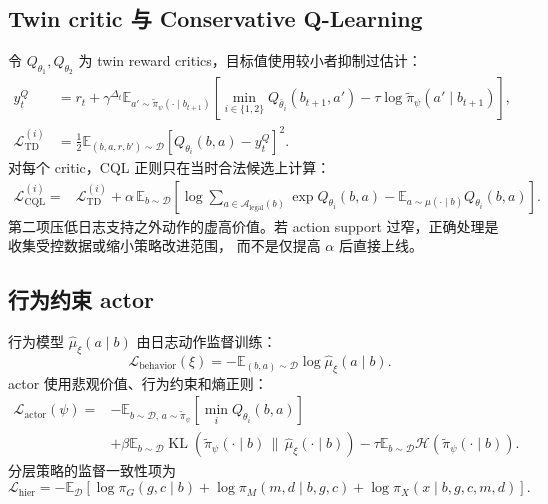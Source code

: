 \documentclass[11pt,a4paper,fontset=none]{ctexart}
\DeclareMathOperator{\KL}{KL}
\newcommand{\E}{\mathbb{E}}
\newcommand{\1}{\mathbb{I}}
\newcommand{\D}{\mathcal{D}}
\newcommand{\Alegal}{\mathcal{A}_{\mathrm{legal}}}
\begin{document}
\subsection{Twin critic 与 Conservative Q-Learning}

令 $Q_{\theta_1},Q_{\theta_2}$ 为 twin reward critics，目标值使用较小者抑制过估计：
\begin{align}
  y_t^Q&=r_t+\gamma^{\Delta_t}
  \E_{a'\sim\widetilde\pi_\psi(\cdot\mid b_{t+1})}
  \left[\min_{i\in\{1,2\}}Q_{\bar\theta_i}(b_{t+1},a')
        -\tau\log\widetilde\pi_\psi(a'\mid b_{t+1})\right],\\
  \mathcal{L}_{\mathrm{TD}}^{(i)}
  &=\frac12\E_{(b,a,r,b')\sim\D}
  \left[Q_{\theta_i}(b,a)-y_t^Q\right]^2.
  \label{eq:td-loss}
\end{align}
对每个 critic，CQL 正则只在当时合法候选上计算：
\begin{align}
  \mathcal{L}_{\mathrm{CQL}}^{(i)}={}&
  \mathcal{L}_{\mathrm{TD}}^{(i)}
  +\alpha\,\E_{b\sim\D}\left[
    \log\sum_{a\in\Alegal(b)}\exp Q_{\theta_i}(b,a)
    -\E_{a\sim\mu(\cdot\mid b)}Q_{\theta_i}(b,a)
  \right].
  \label{eq:cql-loss}
\end{align}
第二项压低日志支持之外动作的虚高价值。若 action support 过窄，正确处理是收集受控数据或缩小策略改进范围，
而不是仅提高 $\alpha$ 后直接上线。

\subsection{行为约束 actor}

行为模型 $\widehat\mu_\xi(a\mid b)$ 由日志动作监督训练：
\begin{equation}
  \mathcal{L}_{\mathrm{behavior}}(\xi)=
  -\E_{(b,a)\sim\D}\log\widehat\mu_\xi(a\mid b).
\end{equation}
actor 使用悲观价值、行为约束和熵正则：
\begin{align}
  \mathcal{L}_{\mathrm{actor}}(\psi)={}&
  -\E_{b\sim\D,\,a\sim\widetilde\pi_\psi}
    \left[\min_i Q_{\theta_i}(b,a)\right]\nonumber\\
  &+\beta\E_{b\sim\D}\KL\!\left(
    \widetilde\pi_\psi(\cdot\mid b)\,\|\,
    \widehat\mu_\xi(\cdot\mid b)\right)
  -\tau\E_{b\sim\D}\mathcal{H}(\widetilde\pi_\psi(\cdot\mid b)).
  \label{eq:actor-loss}
\end{align}
分层策略的监督一致性项为
\begin{equation}
  \mathcal{L}_{\mathrm{hier}}=
  -\E_\D\left[
    \log\pi_G(g,c\mid b)+
    \log\pi_M(m,d\mid b,g,c)+
    \log\pi_X(x\mid b,g,c,m,d)
  \right].
  \label{eq:hier-loss}
\end{equation}
\end{document}
